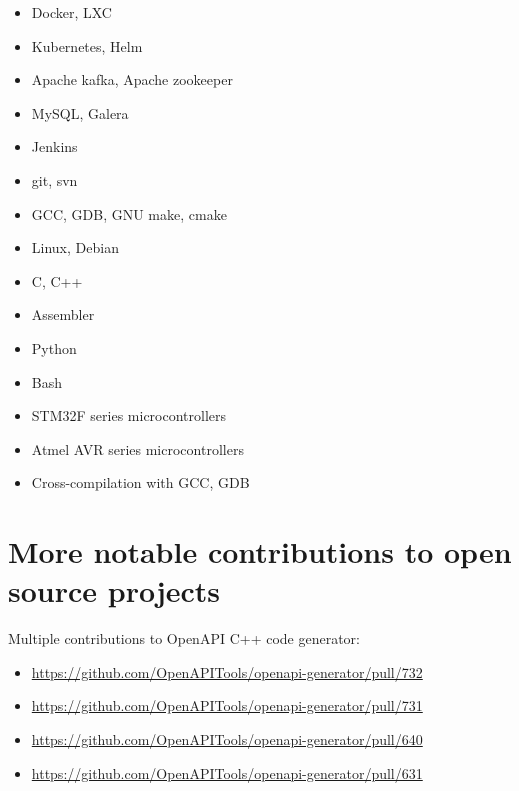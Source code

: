 \documentclass[12]{article}
\begin{document}
\begin{multicols}{2}

\begin{itemize}
	\item{Docker, LXC}
	\item{Kubernetes, Helm}
	\item{Apache kafka, Apache zookeeper}
	\item{MySQL, Galera}
	\item{Jenkins}
	\item{git, svn}
	\item{GCC, GDB, GNU make, cmake}
	\item{Linux, Debian}
\end{itemize}

\columnbreak

\begin{itemize}
	\item{C, C++}
	\item{Assembler}
	\item{Python}
	\item{Bash}
\end{itemize}


\begin{itemize}
	\item{STM32F series microcontrollers}
	\item{Atmel AVR series microcontrollers}
	\item{Cross-compilation with GCC, GDB}
\end{itemize}


\vfill
\end{multicols}


\clearpage

\section{More notable contributions to open source projects}

{
Multiple contributions to OpenAPI C++ code generator:
\begin{itemize}
	\item \url{https://github.com/OpenAPITools/openapi-generator/pull/732}
	\item \url{https://github.com/OpenAPITools/openapi-generator/pull/731}
	\item \url{https://github.com/OpenAPITools/openapi-generator/pull/640}
	\item \url{https://github.com/OpenAPITools/openapi-generator/pull/631}
\end{itemize}
}
\end{document}
